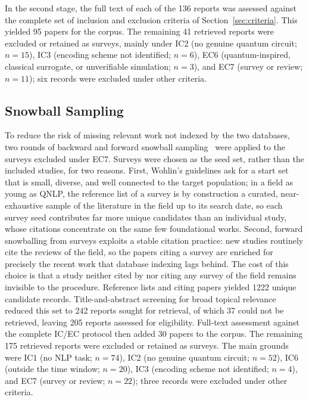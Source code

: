 \documentclass{ieeeaccess}
\begin{document}
In the second stage, the full text of each of the 136 reports was assessed
against the complete set of inclusion and exclusion criteria of
Section~\ref{sec:criteria}. This yielded 95 papers for the corpus. The
remaining 41 retrieved reports were excluded or retained as surveys, mainly
under IC2 (no genuine quantum circuit; $n = 15$), IC3 (encoding scheme not
identified; $n = 6$), EC6 (quantum-inspired, classical surrogate, or
unverifiable simulation; $n = 3$), and EC7 (survey or review; $n = 11$); six
records were excluded under other criteria.

\subsection{Snowball Sampling}
\label{subsec:snowball}

To reduce the risk of missing relevant work not indexed by the two databases,
two rounds of backward and forward snowball sampling~\cite{wohlin2014guidelines} were
applied to the surveys excluded under EC7. Surveys were chosen as the seed set,
rather than the included studies, for two reasons. First, Wohlin's guidelines
ask for a start set that is small, diverse, and well connected to the target
population; in a field as young as QNLP, the reference list of a survey is by
construction a curated, near-exhaustive sample of the literature in the field
up to its search date, so each survey seed contributes far more unique
candidates than an individual study, whose citations concentrate on the same
few foundational works. Second, forward snowballing from surveys exploits a
stable citation practice: new studies routinely cite the reviews of the field,
so the papers citing a survey are enriched for precisely the recent work that
database indexing lags behind. The cost of this choice is that a study neither cited by nor citing any
survey of the field remains invisible to the procedure. Reference lists and citing papers
yielded 1222 unique candidate records. Title-and-abstract screening for broad
topical relevance reduced this set to 242 reports sought for retrieval, of
which 37 could not be retrieved, leaving 205 reports assessed for eligibility.
Full-text assessment against the complete IC/EC protocol then added 30 papers
to the corpus. The remaining 175 retrieved reports were excluded or retained as
surveys. The main grounds were IC1 (no NLP task; $n = 74$), IC2 (no genuine
quantum circuit; $n = 52$), IC6 (outside the time window; $n = 20$), IC3
(encoding scheme not identified; $n = 4$), and EC7 (survey or review;
$n = 22$); three records were excluded under other criteria.
\end{document}
